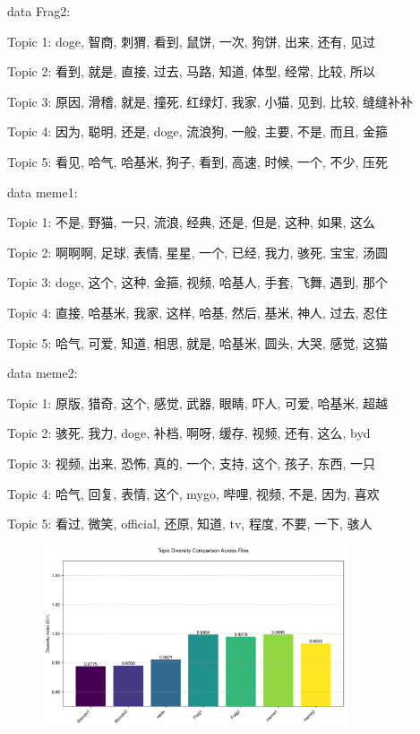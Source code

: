\documentclass[12pt,a4paper]{ctexart}
\theoremstyle{MyLineTheoremStyle}
\theoremstyle{MyBlockTheoremStyle}
\theoremstyle{MySubsubsectionStyle}
\begin{document}
data Frag2:

Topic 1: doge, 智商, 刺猬, 看到, 鼠饼, 一次, 狗饼, 出来, 还有, 见过

Topic 2: 看到, 就是, 直接, 过去, 马路, 知道, 体型, 经常, 比较, 所以

Topic 3: 原因, 滑稽, 就是, 撞死, 红绿灯, 我家, 小猫, 见到, 比较, 缝缝补补

Topic 4: 因为, 聪明, 还是, doge, 流浪狗, 一般, 主要, 不是, 而且, 金箍

Topic 5: 看见, 哈气, 哈基米, 狗子, 看到, 高速, 时候, 一个, 不少, 压死

data meme1:

Topic 1: 不是, 野猫, 一只, 流浪, 经典, 还是, 但是, 这种, 如果, 这么

Topic 2: 啊啊啊, 足球, 表情, 星星, 一个, 已经, 我力, 骇死, 宝宝, 汤圆

Topic 3: doge, 这个, 这种, 金箍, 视频, 哈基人, 手套, 飞舞, 遇到, 那个

Topic 4: 直接, 哈基米, 我家, 这样, 哈基, 然后, 基米, 神人, 过去, 忍住

Topic 5: 哈气, 可爱, 知道, 相思, 就是, 哈基米, 圆头, 大哭, 感觉, 这猫

data meme2:

Topic 1: 原版, 猎奇, 这个, 感觉, 武器, 眼睛, 吓人, 可爱, 哈基米, 超越

Topic 2: 骇死, 我力, doge, 补档, 啊呀, 缓存, 视频, 还有, 这么, byd

Topic 3: 视频, 出来, 恐怖, 真的, 一个, 支持, 这个, 孩子, 东西, 一只

Topic 4: 哈气, 回复, 表情, 这个, mygo, 哔哩, 视频, 不是, 因为, 喜欢

Topic 5: 看过, 微笑, official, 还原, 知道, tv, 程度, 不要, 一下, 骇人

\begin{figure}[htbp]
    \centering
    \includegraphics[width=0.8\textwidth]{img/topic_diversity.png}
\end{figure}
\newpage
\end{document}
